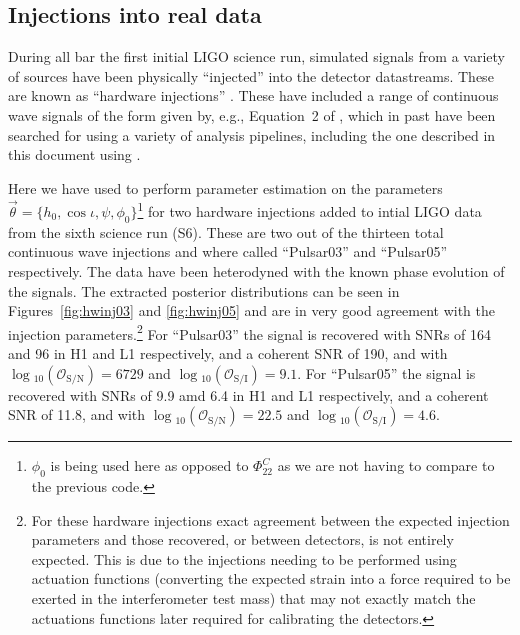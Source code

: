 \subsection{Injections into real data}

During all bar the first initial LIGO science run, simulated signals from a variety of sources have been physically ``injected'' into the detector
datastreams. These are known as ``hardware injections'' \citep[see][for a general discussion of hardware injections, in particular relating to their
use, and extraction, in advanced LIGO's first obersving run]{2016arXiv161207864B}. These have included a range of continuous wave signals of the form given
by, e.g., Equation~2 of \citet{2017arXiv170107709T}, which in past have been searched for using a variety of analysis pipelines, including the one
described in this document using \lppe \citep[see, e.g., Appendix~B of][]{2007PhRvD..76d2001A}.

Here we have used \lppen to perform parameter estimation on the parameters $\vec{\theta} = \{h_0, \cos{\iota}, \psi, \phi_{0}\}$\footnote{$\phi_0$ is
being used here as opposed to $\Phi_{22}^C$ as we are not having to compare to the previous code.} for two hardware injections added to intial LIGO
data from the sixth science run (S6). These are two out of the thirteen total continuous wave injections and where called ``Pulsar03'' and ``Pulsar05''
respectively. The data have been heterodyned with the known phase evolution of the signals. The extracted posterior distributions can be seen in
Figures~\ref{fig:hwinj03} and \ref{fig:hwinj05} and are in very good agreement with the injection parameters.\footnote{For these hardware injections
exact agreement between the expected injection parameters and those recovered, or between detectors, is not entirely expected. This is due to the
injections needing to be performed using actuation functions (converting the expected \gw strain into a force required to be exerted in the
interferometer test mass) that may not exactly match the actuations functions later required for calibrating the detectors.} For ``Pulsar03''
the signal is recovered with SNRs of 164 and 96 in H1 and L1 respectively, and a coherent SNR of 190, and with
$\log{}_{10}\left(\mathcal{O}_{\text{S}/\text{N}}\right) = 6729$ and $\log{}_{10}\left(\mathcal{O}_{\text{S}/\text{I}}\right) = 9.1$. For ``Pulsar05''
the signal is recovered with SNRs of 9.9 amd 6.4 in H1 and L1 respectively, and a coherent SNR of 11.8, and with
$\log{}_{10}\left(\mathcal{O}_{\text{S}/\text{N}}\right) = 22.5$ and $\log{}_{10}\left(\mathcal{O}_{\text{S}/\text{I}}\right) = 4.6$.

